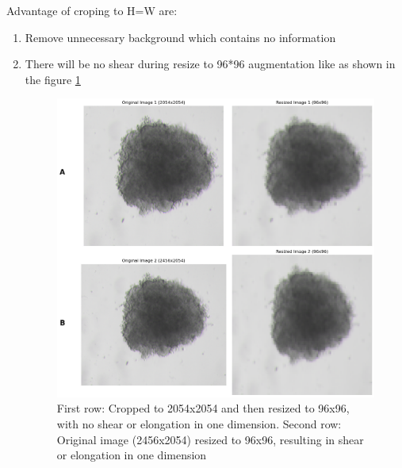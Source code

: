 \begin{enumerate}
    Advantage of croping to H=W are:
    \begin{enumerate}
      \item  Remove unnecessary background which contains no information
      \item  There will be no shear during resize to 96*96 augmentation like as shown in the figure \ref{fig:elong}
      \begin{figure}[H]
        \centering
        \includegraphics[scale=0.46]{figures/long.png} 
        \caption{First row: Cropped to 2054x2054 and then resized to 96x96, with no shear or elongation in one dimension. Second row: Original image (2456x2054) resized to 96x96, resulting in shear or elongation in one dimension}
        \label{fig:elong}
      \end{figure}
      

\end{enumerate}
\end{enumerate}
